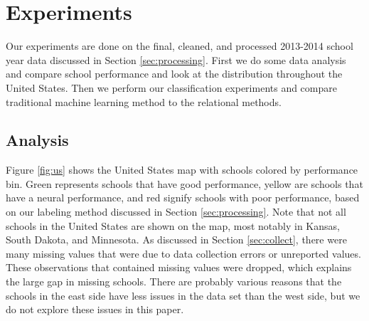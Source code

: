 \section{Experiments} \label{sec:experiment}

Our experiments are done on the final, cleaned, and processed 2013-2014 school year data discussed in Section \ref{sec:processing}. First we do some data analysis and compare school performance and look at the distribution throughout the United States. Then we perform our classification experiments and compare traditional machine learning method to the relational methods.

\begin{table}
	\caption{Statistics about the education dataset.}
	\label{tab:classes}
\end{table}

\subsection{Analysis} \label{sec:analysis}

Figure \ref{fig:us} shows the United States map with schools colored by performance bin. Green represents schools that have good performance, yellow are schools that have a neural performance, and red signify schools with poor performance, based on our labeling method discussed in Section \ref{sec:processing}. Note that not all schools in the United States are shown on the map, most notably in Kansas, South Dakota, and Minnesota. As discussed in Section \ref{sec:collect}, there were many missing values that were due to data collection errors or unreported values. These observations that contained missing values were dropped, which explains the large gap in missing schools. There are probably various reasons that the schools in the east side have less issues in the data set than the west side, but we do not explore these issues in this paper.

